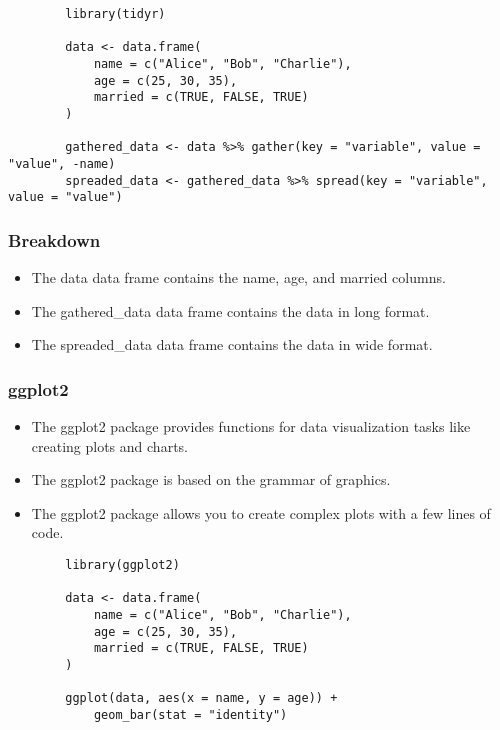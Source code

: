 \documentclass[serif, 9pt, aspectratio=32]{beamer}
\begin{document}
\begin{frame}[fragile]
    \begin{lstlisting}
        library(tidyr)

        data <- data.frame(
            name = c("Alice", "Bob", "Charlie"),
            age = c(25, 30, 35),
            married = c(TRUE, FALSE, TRUE)
        )

        gathered_data <- data %>% gather(key = "variable", value = "value", -name)
        spreaded_data <- gathered_data %>% spread(key = "variable", value = "value")
    \end{lstlisting}
\end{frame}

\begin{frame}
    \centering
    \frametitle{Breakdown}
    \begin{itemize}
        \setlength{\itemsep}{2em}
        \item The data data frame contains the name, age, and married columns.
        \item The gathered\_data data frame contains the data in long format.
        \item The spreaded\_data data frame contains the data in wide format.
    \end{itemize}
\end{frame}

\begin{frame}
    \centering
    \frametitle{ggplot2}
    \begin{itemize}
        \setlength{\itemsep}{2em}
        \item The ggplot2 package provides functions for data visualization tasks like creating plots and charts.
        \item The ggplot2 package is based on the grammar of graphics.
        \item The ggplot2 package allows you to create complex plots with a few lines of code.
    \end{itemize}
\end{frame}

\begin{frame}[fragile]
    \begin{lstlisting}
        library(ggplot2)

        data <- data.frame(
            name = c("Alice", "Bob", "Charlie"),
            age = c(25, 30, 35),
            married = c(TRUE, FALSE, TRUE)
        )

        ggplot(data, aes(x = name, y = age)) +
            geom_bar(stat = "identity")
    \end{lstlisting}
\end{frame}
\end{document}
